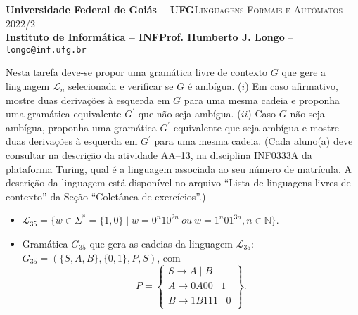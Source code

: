 \documentclass[12pt]{article}
\def\discente{João Lucas Rodrigues Soares}
\def\matricula{202003580}
\def\ua{13}
\def\myling{{35}} %
\begin{document}
 \begin{tcolorbox}[rounded corners, colback=blue!3, colframe=blue!40!black]
  \footnotesize\textbf{Universidade Federal de Goiás -- UFG}\hfill \textsc{Linguagens Formais e Autômatos -- 2022/2}\\
  \footnotesize\textbf{Instituto de Informática -- INF\hfill Prof. Humberto J. Longo} -- \scriptsize\texttt{longo@inf.ufg.br}
 \end{tcolorbox}\bigskip
%
\begin{tcolorbox}[rounded corners, colback=blue!2, colframe=blue!40!black, title=\textbf{Atividade AA-\ua}]
  Nesta tarefa deve-se propor uma gramática livre de contexto $G$ que gere a linguagem $\mathcal{L}_n$ selecionada e verificar se $G$ é ambígua. ($i$) Em caso afirmativo, mostre duas derivações à esquerda em $G$ para uma mesma cadeia e proponha uma gramática equivalente $G^\prime$ que não seja ambígua. ($ii$) Caso $G$ não seja ambígua, proponha uma gramática $G^\prime$ equivalente que seja ambígua e mostre duas derivações à esquerda em $G^\prime$ para uma mesma cadeia. (Cada aluno(a) deve consultar na descrição da atividade AA--\ua, na disciplina INF0333A da plataforma Turing, qual é a linguagem associada ao seu número de matrícula. A descrição da linguagem está disponível no arquivo ``Lista de linguagens livres de contexto'' da Seção ``Coletânea de exercícios''.)
\end{tcolorbox}\bigskip

%

\begin{tcolorbox}[rounded corners, colback=yellow!5, colframe=red!40!black, title={\discente\ (\matricula)}]
\begin{itemize}
  \item $\mathcal{L}_{\myling} = \{w \in \Sigma^* = \{1,0\} \mid w = 0^n10^{2n}\  ou\ w = 1^n01^{3n}, n \in \mathbb{N}\}$.
  \item Gramática $G_{\myling}$ que gera as cadeias da linguagem $\mathcal{L}_{\myling}$:\\   $G_{\myling}=(\{S,A,B\},\{0,1\},P,S)$, com
  $$
   P =
   \left\{\begin{array}{l}
    S\to A\mid B\\
    A\to 0A00\mid 1\\
    B\to 1B111\mid 0
   \end{array}\right\}.
  $$
 \end{itemize}
\end{tcolorbox}\bigskip
\end{document}
